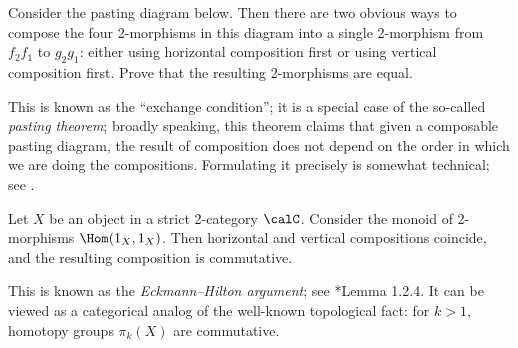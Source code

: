 \begin{exercise}\label{ec:exchange_condition}
  Consider the pasting diagram below. Then there are two obvious ways to
  compose the four 2-morphisms in this diagram into a single 2-morphism from
  $f_2f_1$ to $g_2g_1$: either using horizontal composition first or using
  vertical composition first. Prove that the resulting 2-morphisms are equal.

  \begin{figure}[h]
  \end{figure}
  This is known as the ``exchange condition''; it is a special case of the
  so-called \emph{pasting theorem}; broadly speaking, this theorem claims that given a
  composable pasting diagram, the result of composition does not depend on the order
  in which we are doing the compositions. Formulating it precisely is somewhat
  technical; see .
\end{exercise}
\begin{lemma}\label{l:eckmann-hilton}
  Let $X$ be an object in a strict 2-category $\calC$. Consider the monoid of
  2-morphisms $\Hom(1_X, 1_X)$. Then horizontal and vertical compositions
  coincide, and the resulting composition is commutative.
\end{lemma}
This is known as the \emph{Eckmann--Hilton argument}; see
*{Lemma 1.2.4}. It can be viewed as a categorical analog of
the well-known topological fact: for $k>1$, homotopy groups $\pi_k(X)$
are commutative.

